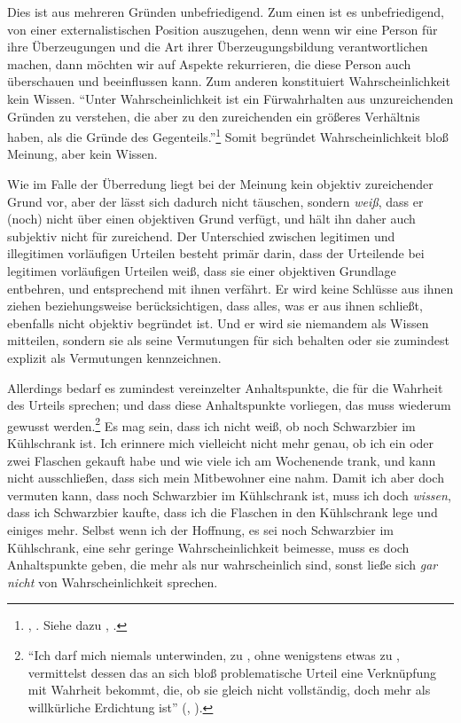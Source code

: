 Dies ist aus mehreren Gründen unbefriedigend. Zum einen ist es unbefriedigend,
von einer externalistischen Position auszugehen, denn wenn wir eine Person für
ihre Überzeugungen und die Art ihrer Überzeugungsbildung verantwortlichen
machen, dann möchten wir auf Aspekte rekurrieren, die diese Person auch
überschauen und beeinflussen kann. Zum anderen konstituiert Wahrscheinlichkeit
kein Wissen. \enquote{Unter Wahrscheinlichkeit ist
ein Fürwahrhalten aus unzureichenden Gründen zu verstehen, die aber zu den
zureichenden ein größeres Verhältnis haben, als die Gründe des
Gegenteils.}\footnote{\cite[][A 126]{Kant:ImmanuelKantsLogik1977},
\cite[][IX: 81.23--26]{Kant:GesammelteWerke1900ff.}. Siehe dazu
\cite[][]{Kant:Reflexionen1900ff.},
\cite[][XVI: 9--11]{Kant:GesammelteWerke1900ff.}.} Somit begründet
Wahrscheinlichkeit bloß Meinung, aber kein Wissen.

Wie im Falle der Überredung liegt bei der Meinung kein objektiv zureichender
Grund vor, aber der  lässt sich dadurch nicht täuschen,
sondern \emph{weiß}, dass er (noch) nicht über einen objektiven Grund verfügt,
und hält ihn daher auch subjektiv nicht für zureichend. Der Unterschied zwischen
legitimen und illegitimen vorläufigen Urteilen besteht primär darin, dass der
Urteilende bei legitimen vorläufigen Urteilen weiß, dass sie einer objektiven
Grundlage entbehren, und entsprechend mit ihnen verfährt.
Er wird keine Schlüsse aus ihnen ziehen beziehungsweise berücksichtigen, dass
alles, was er aus ihnen schließt, ebenfalls nicht objektiv begründet ist. Und er
wird sie niemandem als Wissen mitteilen, sondern sie als seine Vermutungen für
sich behalten oder sie zumindest explizit als Vermutungen kennzeichnen.

Allerdings bedarf es zumindest vereinzelter Anhaltspunkte, die für die Wahrheit
des Urteils sprechen; und dass diese Anhaltspunkte vorliegen, das muss wiederum
gewusst werden.\footnote{\enquote{Ich darf mich niemals unterwinden, zu ,
ohne wenigstens etwas zu , vermittelst dessen das an sich bloß
problematische Urteil eine Verknüpfung mit Wahrheit bekommt, die, ob sie
gleich nicht vollständig, doch mehr als willkürliche Erdichtung ist}
\mkbibparens{\cite[][B 850]{Kant:KritikderreinenVernunft2003},
\cite[][III: 533.9--12]{Kant:GesammelteWerke1900ff.}}.} Es mag sein, dass ich
nicht weiß, ob noch Schwarzbier im Kühlschrank ist. Ich erinnere mich vielleicht
nicht mehr genau, ob ich ein oder zwei Flaschen gekauft habe und wie viele ich
am Wochenende trank, und kann nicht ausschließen, dass sich mein Mitbewohner eine
nahm. Damit ich aber doch vermuten kann, dass noch Schwarzbier im Kühlschrank
ist, muss ich doch \emph{wissen}, dass ich Schwarzbier kaufte, dass ich die
Flaschen in den Kühlschrank lege und einiges mehr. Selbst wenn ich der Hoffnung,
es sei noch Schwarzbier im Kühlschrank, eine sehr geringe Wahrscheinlichkeit
beimesse, muss es doch Anhaltspunkte geben, die mehr als nur wahrscheinlich
sind, sonst ließe sich \emph{gar nicht} von Wahrscheinlichkeit sprechen.

